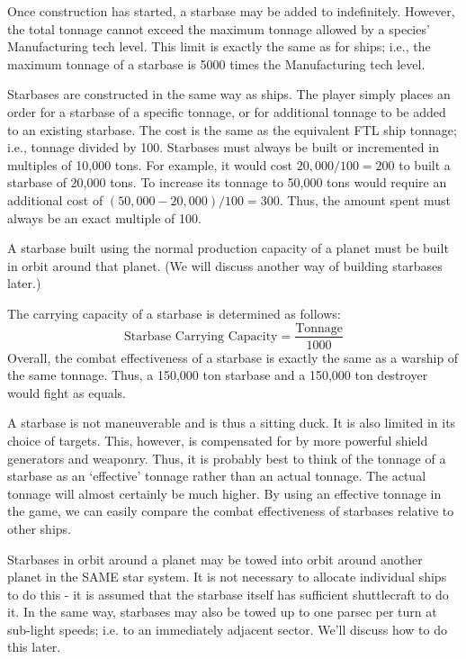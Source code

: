 \documentclass[10pt,titlepage]{article}
\begin{document}
Once construction has started, a starbase may be added to indefinitely.
However, the total tonnage cannot exceed the maximum tonnage allowed by
a species' Manufacturing tech level.  This limit is exactly the same as
for ships; i.e., the maximum tonnage of a starbase is 5000 times the
Manufacturing tech level.

Starbases are constructed in the same way as ships.  The player simply places
an order for a starbase of a specific tonnage, or for additional tonnage to
be added to an existing starbase.  The cost is the same as the equivalent FTL
ship tonnage; i.e., tonnage divided by 100.  Starbases must always be built
or incremented in multiples of 10,000 tons.  For example, it would cost
$20,000/100 = 200$ to built a starbase of 20,000 tons.  To increase its tonnage
to 50,000 tons would require an additional cost of $(50,000-20,000)/100=300$.
Thus, the amount spent must always be an exact multiple of 100.

A starbase built using the normal production capacity of a planet must be
built in orbit around that planet.  (We will discuss another way of building
starbases later.)

The carrying capacity of a starbase is determined as follows:
\[
	\textrm{Starbase Carrying Capacity}  =   \dfrac{\textrm{Tonnage}}{1000}
\]
Overall, the combat effectiveness of a starbase is exactly the same as a
warship of the same tonnage.  Thus, a 150,000 ton starbase and a 150,000 ton
destroyer would fight as equals.

\begin{informationnote}
A starbase is not maneuverable and is thus a sitting duck.  It is also limited
in its choice of targets.  This, however, is compensated for by more powerful
shield generators and weaponry.  Thus, it is probably best to think of the
tonnage of a starbase as an `effective' tonnage rather than an actual tonnage.
The actual tonnage will almost certainly be much higher.  By using an effective
tonnage in the game, we can easily compare the combat effectiveness of
starbases relative to other ships.
\end{informationnote}

\noindent Starbases in orbit around a planet may be towed into orbit around another
planet in the SAME star system.  It is not necessary to allocate individual
ships to do this - it is assumed that the starbase itself has sufficient
shuttlecraft to do it.  In the same way, starbases may also be towed up to one
parsec per turn at sub-light speeds; i.e. to an immediately adjacent sector.
We'll discuss how to do this later.
\end{document}
